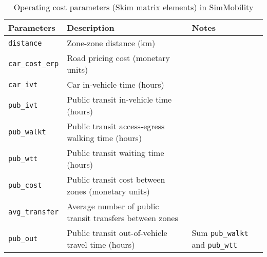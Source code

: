 \documentclass[11pt,twoside]{article}
\numberwithin{equation}{section}
\newcommand{\?}{\stackrel{?}{=}}
\begin{document}
\begin{table}[h!]\small
  \centering
  \begin{tabular}{l l l } \toprule
    \textbf{Parameters}            & \textbf{Description}  & \textbf{Notes} \\ \midrule
    \texttt{distance}     & Zone-zone distance (km) & \\
    \texttt{car\_cost\_erp} & Road pricing cost (monetary units) &  \\
    \texttt{car\_ivt}     & Car in-vehicle time  (hours) & \\
    \texttt{pub\_ivt}     & Public transit in-vehicle time (hours) & \\
    \texttt{pub\_walkt}   & Public transit access-egress walking time (hours) & \\
    \texttt{pub\_wtt}     & Public transit waiting time (hours) & \\
    \texttt{pub\_cost}    & Public transit cost between zones (monetary units) & \\
    \texttt{avg\_transfer}& Average number of public transit transfers between zones & \\
    \texttt{pub\_out}     & Public transit out-of-vehicle travel time (hours) & Sum  \texttt{pub\_walkt} and  \texttt{pub\_wtt} \\ \bottomrule
  \end{tabular}
  \caption{Operating cost parameters (Skim matrix elements) in SimMobility}
  \label{tab:opcosts}
\end{table}
\end{document}
